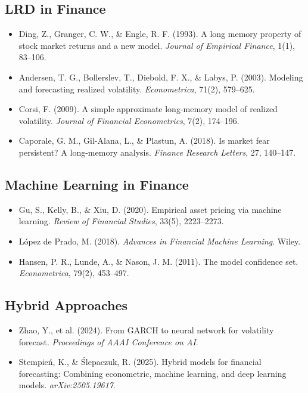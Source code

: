 \documentclass[11pt,a4paper]{article}
\theoremstyle{definition}
\begin{document}
\subsection*{LRD in Finance}

\begin{itemize}
    \item Ding, Z., Granger, C. W., \& Engle, R. F. (1993). A long memory property of stock market returns and a new model. \textit{Journal of Empirical Finance}, 1(1), 83--106.
    
    \item Andersen, T. G., Bollerslev, T., Diebold, F. X., \& Labys, P. (2003). Modeling and forecasting realized volatility. \textit{Econometrica}, 71(2), 579--625.
    
    \item Corsi, F. (2009). A simple approximate long-memory model of realized volatility. \textit{Journal of Financial Econometrics}, 7(2), 174--196.
    
    \item Caporale, G. M., Gil-Alana, L., \& Plastun, A. (2018). Is market fear persistent? A long-memory analysis. \textit{Finance Research Letters}, 27, 140--147.
\end{itemize}

\subsection*{Machine Learning in Finance}

\begin{itemize}
    \item Gu, S., Kelly, B., \& Xiu, D. (2020). Empirical asset pricing via machine learning. \textit{Review of Financial Studies}, 33(5), 2223--2273.
    
    \item López de Prado, M. (2018). \textit{Advances in Financial Machine Learning}. Wiley.
    
    \item Hansen, P. R., Lunde, A., \& Nason, J. M. (2011). The model confidence set. \textit{Econometrica}, 79(2), 453--497.
\end{itemize}

\subsection*{Hybrid Approaches}

\begin{itemize}
    \item Zhao, Y., et al. (2024). From GARCH to neural network for volatility forecast. \textit{Proceedings of AAAI Conference on AI}.
    
    \item Stempień, K., \& Ślepaczuk, R. (2025). Hybrid models for financial forecasting: Combining econometric, machine learning, and deep learning models. \textit{arXiv:2505.19617}.
\end{itemize}
\end{document}
